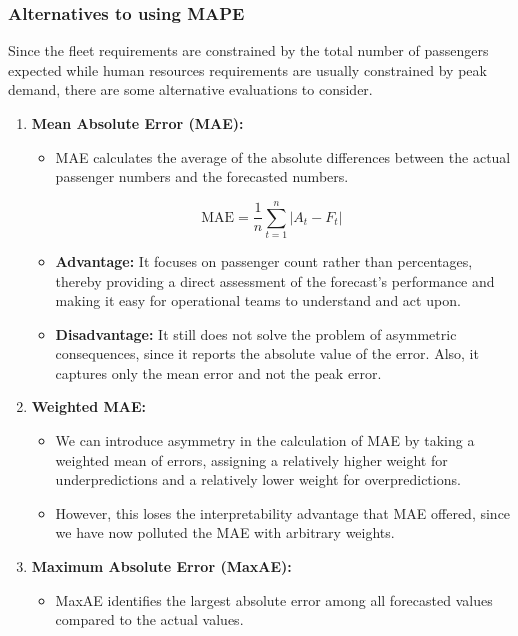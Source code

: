 \documentclass{article}
\begin{document}
\subsubsection{Alternatives to using MAPE}

Since the fleet requirements are constrained by the total number of passengers expected while human resources requirements are usually constrained by peak demand, there are some alternative evaluations to consider.

\begin{enumerate}
    \item \textbf{Mean Absolute Error (MAE):}
      \begin{itemize}
          \item
            MAE calculates the average of the absolute differences between the
            actual passenger numbers and the forecasted numbers.
      \end{itemize} 
\[
\text{MAE} = \frac{1}{n} \sum_{t=1}^{n} |A_t - F_t|
\]

\begin{itemize}
\item
  \textbf{Advantage:} It focuses on passenger count rather than
  percentages, thereby providing a direct assessment of the forecast's
  performance and making it easy for operational teams to understand and
  act upon.
\item
  \textbf{Disadvantage:} It still does not solve the problem of
  asymmetric consequences, since it reports the absolute value of the
  error. Also, it captures only the mean error and not the peak error.
\end{itemize}

\item
  \textbf{Weighted MAE:}

  \begin{itemize}
  \item
    We can introduce asymmetry in the calculation of MAE by taking a
    weighted mean of errors, assigning a relatively higher weight for
    underpredictions and a relatively lower weight for overpredictions.
  \item
    However, this loses the interpretability advantage that MAE offered,
    since we have now polluted the MAE with arbitrary weights.
  \end{itemize}
\item
  \textbf{Maximum Absolute Error (MaxAE):}

  \begin{itemize}
  \item
    MaxAE identifies the largest absolute error among all forecasted
    values compared to the actual values.
  \end{itemize}


\end{enumerate}
\end{document}

